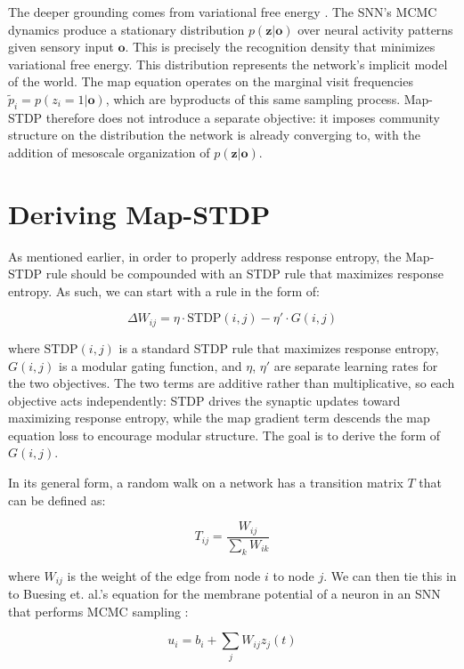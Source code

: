 \documentclass[pdflatex,sn-mathphys-num]{sn-jnl}%
\theoremstyle{thmstyleone}%
\theoremstyle{thmstyletwo}%
\theoremstyle{thmstylethree}%
\begin{document}
The deeper grounding comes from variational free energy \cite{Friston2010-cj}. The SNN's MCMC dynamics \cite{Buesing2011-ka} produce a stationary distribution $p(\mathbf{z}|\mathbf{o})$ over neural activity patterns given sensory input $\mathbf{o}$. This is precisely the recognition density that minimizes variational free energy. This distribution represents the network's implicit model of the world. The map equation operates on the marginal visit frequencies $\tilde{p}_i = p(z_i = 1 | \mathbf{o})$, which are byproducts of this same sampling process. Map-STDP therefore does not introduce a separate objective: it imposes community structure on the distribution the network is already converging to, with the addition of mesoscale organization of $p(\mathbf{z}|\mathbf{o})$.

\section{Deriving Map-STDP}\label{sec2}

As mentioned earlier, in order to properly address response entropy, the Map-STDP rule should be compounded with an STDP rule that maximizes response entropy. As such, we can start with a rule in the form of:

\begin{equation}
\Delta W_{ij} = \eta \cdot \text{STDP}(i, j) - \eta' \cdot G(i, j)
\label{eq:learning-rate}
\end{equation}

where $\text{STDP}(i, j)$ is a standard STDP rule that maximizes response entropy, $G(i, j)$ is a modular gating function, and $\eta$, $\eta'$ are separate learning rates for the two objectives. The two terms are additive rather than multiplicative, so each objective acts independently: STDP drives the synaptic updates toward maximizing response entropy, while the map gradient term descends the map equation loss to encourage modular structure. The goal is to derive the form of $G(i, j)$.

In its general form, a random walk on a network has a transition matrix $T$ that can be defined as:

$$T_{ij} = \frac{W_{ij}}{\sum_k W_{ik}}$$

where $W_{ij}$ is the weight of the edge from node $i$ to node $j$. We can then tie this in to Buesing et. al.'s equation for the membrane potential of a neuron in an SNN that performs MCMC sampling \cite{Buesing2011-ka}:

$$u_i = b_i + \sum_j W_{ij} z_j(t)$$
\end{document}
